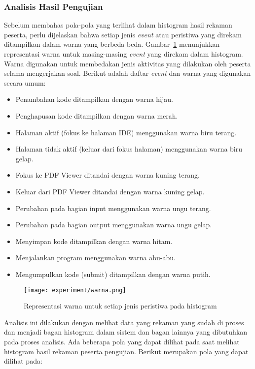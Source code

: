 \subsubsection{Analisis Hasil Pengujian}

Sebelum membahas pola-pola yang terlihat dalam histogram hasil rekaman peserta, perlu dijelaskan bahwa setiap jenis \textit{event} atau peristiwa yang direkam ditampilkan dalam warna yang berbeda-beda. Gambar~\ref{fig:warnaevent} menunjukkan representasi warna untuk masing-masing \textit{event} yang direkam dalam histogram. Warna digunakan untuk membedakan jenis aktivitas yang dilakukan oleh peserta selama mengerjakan soal. Berikut adalah daftar \textit{event} dan warna yang digunakan secara umum:

\begin{itemize}
    \item Penambahan kode ditampilkan dengan warna hijau.
    \item Penghapusan kode ditampilkan dengan warna merah.
    \item Halaman aktif (fokus ke halaman IDE) menggunakan warna biru terang.
    \item Halaman tidak aktif (keluar dari fokus halaman) menggunakan warna biru gelap.
    \item Fokus ke PDF Viewer ditandai dengan warna kuning terang.
    \item Keluar dari PDF Viewer ditandai dengan warna kuning gelap.
    \item Perubahan pada bagian input menggunakan warna ungu terang.
    \item Perubahan pada bagian output menggunakan warna ungu gelap.
    \item Menyimpan kode ditampilkan dengan warna hitam.
    \item Menjalankan program menggunakan warna abu-abu.
    \item Mengumpulkan kode (submit) ditampilkan dengan warna putih.
\end{itemize}

\begin{figure}[h]
\centering
\texttt{[image: experiment/warna.png]}
\caption{Representasi warna untuk setiap jenis peristiwa pada histogram}
\label{fig:warnaevent}
\end{figure}

Analisis ini dilakukan dengan melihat data yang rekaman yang sudah di proses dan menjadi bagan histogram dalam sistem dan bagan lainnya yang dibutuhkan pada proses analisis. Ada beberapa pola yang dapat dilihat pada saat melihat histogram hasil rekaman peserta pengujian. Berikut merupakan pola yang dapat dilihat pada:

